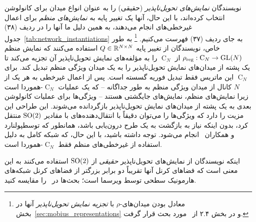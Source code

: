 نویسندگان \emph{نمایش‌های تحویل‌ناپذیر} (حقیقی) را به عنوان انواع میدان برای کانولوشن انتخاب کرده‌اند، با این حال، آنها یک تغییر پایه به \emph{نمایش‌های منظم} برای اعمال غیرخطی‌های  انجام می‌دهند، به همین دلیل ما آنها را در ردیف (۳۸) جدول~\ref{tab:network_instantiations} به جای ردیف (۳۷) فهرست می‌کنیم.%
\footnote{
    معادل بودن میدان‌های-$\rho$ با \emph{تجزیه نمایش تحویل‌ناپذیر} آنها در بخش~\ref{sec:mobius_representations} و در بخش ۲.۴ از~\cite{Weiler2019_E2CNN} مورد بحث قرار گرفت.
}
به طور خاص، نویسندگان از تغییر پایه $Q\in\mathbb{R}^{N\times N}$ استفاده می‌کنند که نمایش منظم $\rho_{\textup{reg}}: \operatorname{C}_N \to \operatorname{GL}(N)$ از $\operatorname{C}_N$ را به مؤلفه‌های نمایش تحویل‌ناپذیر آن تجزیه می‌کند تا یک پشته از میدان‌های نمایش تحویل‌ناپذیر را به یک میدان ویژگی منظم تبدیل کند.
برای $\operatorname{C}_N$ این ماتریس فقط تبدیل فوریه گسسته است.
پس از اعمال غیرخطی  به هر یک از $N$ کانال از میدان ویژگی منظم به طور جداگانه -- که یک عملیات $\operatorname{C}_N$-هموردا است زیرا نمایش‌های منظم، نمایش‌های جایگشتی هستند -- ویژگی‌ها برای عملیات کانولوشن بعدی به یک پشته از میدان‌های نمایش تحویل‌ناپذیر بازگردانده می‌شوند.
این طراحی این مزیت را دارد که ویژگی‌ها را می‌توان دقیقاً با انتقال‌دهنده‌های با مقادیر $\operatorname{SO}(2)$ منتقل کرد، بدون اینکه نیاز به بازگشت به یک طرح درون‌یابی باشد، همانطور که توسطپولنارد و همکاران~\cite{poulenard2018multi} انجام می‌شود.
توجه داشته باشید، با این حال، که شبکه کامل به دلیل استفاده از غیرخطی‌های منظم فقط $\operatorname{C}_N$-هموردا است.

اینکه نویسندگان از نمایش‌های تحویل‌ناپذیر \emph{حقیقی} از $\operatorname{SO}(2)$ استفاده می‌کنند به این معنی است که فضاهای کرنل آنها تقریباً دو برابر بزرگتر از فضاهای کرنل شبکه‌های هارمونیک سطحی توسط ویرسما\cite{Wiersma2020} است؛ بحث‌ها در~\cite{Weiler2019_E2CNN,lang2020WignerEckart} را مقایسه کنید.



